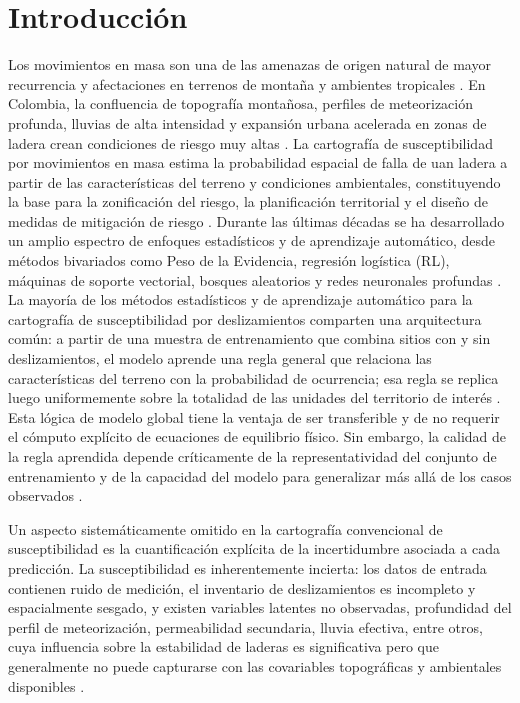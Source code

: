 \documentclass[letterpaper,11pt]{tec}
\begin{document}
{%
\normalsize


\vspace{-0.35cm}
\section{Introducción}
\renewcommand{\tablename}{Tabla}
\renewcommand{\figurename}{Figura}

Los movimientos en masa son una de las amenazas de origen natural de mayor recurrencia y afectaciones en terrenos de montaña y
ambientes tropicales \citep{Varnes1978, Hungr2014, Gomez2023}. En Colombia, la confluencia de topografía montañosa, perfiles de meteorización
profunda, lluvias de alta intensidad y expansión urbana acelerada en zonas de ladera crean condiciones de riesgo muy altas
\citep{Aristizabal2012}. La cartografía de susceptibilidad por movimientos en masa estima la probabilidad espacial de falla de uan ladera a partir de las características
del terreno y condiciones ambientales, constituyendo la base para la zonificación del riesgo, la planificación territorial y el diseño 
de medidas de mitigación de riesgo \citep{Guzzetti2005, Corominas2014}. Durante las últimas décadas se ha desarrollado un amplio 
espectro de enfoques estadísticos
y de aprendizaje automático, desde métodos bivariados como Peso de la Evidencia, regresión logística (RL), máquinas de soporte vectorial, bosques
aleatorios y redes neuronales profundas \citep{Reichenbach2018, Chen2017, Corominas2014}. La mayoría de los métodos estadísticos y de 
aprendizaje automático para la cartografía de susceptibilidad por deslizamientos comparten una
arquitectura común: a partir de una muestra de entrenamiento que combina sitios con y sin deslizamientos, el modelo aprende una
regla general que relaciona las características del terreno con la probabilidad de ocurrencia; esa regla se replica luego
uniformemente sobre la totalidad de las unidades del territorio de interés \citep{VanWesten2003, Reichenbach2018}. Esta lógica de modelo global
tiene la ventaja de ser transferible y de no requerir el cómputo explícito de ecuaciones de equilibrio físico. Sin embargo, la
calidad de la regla aprendida depende críticamente de la representatividad del conjunto de entrenamiento y de la capacidad del
modelo para generalizar más allá de los casos observados \citep{Heckmann2014}.

Un aspecto sistemáticamente omitido en la cartografía convencional de susceptibilidad es la cuantificación explícita de la
incertidumbre asociada a cada predicción. La susceptibilidad es inherentemente incierta: los datos de entrada contienen ruido de
medición, el inventario de deslizamientos es incompleto y espacialmente sesgado, y existen variables latentes no observadas, 
profundidad del perfil de meteorización, permeabilidad secundaria, lluvia efectiva, entre otros, cuya influencia sobre la estabilidad de laderas
es significativa pero que generalmente no puede capturarse con las covariables topográficas y ambientales disponibles \citep{Corominas2014}.

}
\end{document}
